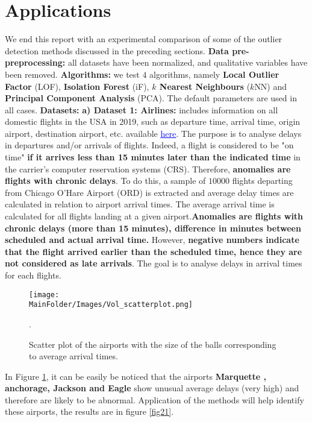 \section{Applications}\label{Section:6}
We end this report with  an experimental comparison of some of the outlier detection methods discussed in the preceding sections. 
\newl \textbf{Data pre-preprocessing:} all datasets have been normalized, and qualitative variables have been removed.
\newl \textbf{Algorithms:} we test $4$ algorithms, namely  \textbf{Local Outlier Factor}  (LOF), \textbf{Isolation Forest} (iF), \textbf{$k$ Nearest Neighbours} ($k$NN) and \textbf{Principal Component Analysis} (PCA). The default parameters are used in all cases.  \newl
\textbf{Datasets:}
%
%
\noindent \textbf{a) Dataset 1: Airlines:} includes information on all domestic flights in the USA in 2019, such as departure time, arrival time, origin airport, destination airport, etc. available  \href{https://www.transtats.bts.gov/DL_SelectFields.asp?Table_ID=}{\textcolor{blue}{\underline{here}}}. The purpose is to analyse delays in departures and/or arrivals of flights. Indeed, a flight is considered to be "on time" \textbf{if it arrives less than 15 minutes later than the indicated time} in the carrier's computer reservation systems (CRS). Therefore, \textbf{anomalies are flights with chronic delays}. To do this, a sample of $10000$ flights departing from Chicago O'Hare Airport (ORD) is extracted and average delay times are calculated in relation to airport arrival times. The average arrival time is calculated for all flights landing at a given airport.\textbf{Anomalies are flights with chronic delays (more than 15 minutes), difference in minutes between scheduled and actual arrival time.} However, \textbf{negative numbers indicate that the flight arrived earlier than the scheduled time, hence they are not considered as late arrivals}.  The goal is to analyse delays in arrival times for each flights.
\begin{figure}
    \centering
    \texttt{[image: \\MainFolder/Images/Vol\_scatterplot.png]}
    \caption{Scatter plot of the airports with the size of the balls corresponding to average arrival times.}%
    \label{fig20}.
\end{figure}
\noindent In Figure \ref{fig20}, it can be easily be noticed  that the airports \textbf{Marquette , anchorage, Jackson and Eagle} show unusual average delays (very high) and therefore are likely to be abnormal. Application of the methods will help identify these airports, the results are in figure \ref{fig21}.\newl
